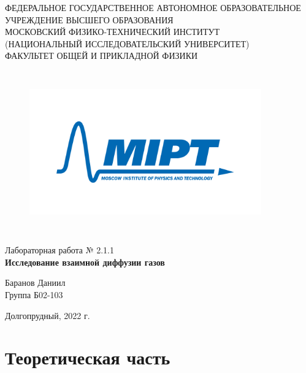 \documentclass[a4paper,12pt]{article} %
\begin{document}
\begin{center}
	\footnotesize{ФЕДЕРАЛЬНОЕ ГОСУДАРСТВЕННОЕ АВТОНОМНОЕ ОБРАЗОВАТЕЛЬНОЕ 			УЧРЕЖДЕНИЕ ВЫСШЕГО ОБРАЗОВАНИЯ}\\
	\footnotesize{МОСКОВСКИЙ ФИЗИКО-ТЕХНИЧЕСКИЙ ИНСТИТУТ\\(НАЦИОНАЛЬНЫЙ 			ИССЛЕДОВАТЕЛЬСКИЙ УНИВЕРСИТЕТ)}\\
	\footnotesize{ФАКУЛЬТЕТ ОБЩЕЙ И ПРИКЛАДНОЙ ФИЗИКИ\\}
	\hfill \break
	\hfill \break
	\hfill \break
	\hfill \break
\end{center}


\begin{figure}[h]
    \centering
    \includegraphics*[width=10cm,height=7cm,keepaspectratio]{mipt_eng_text_png.png}
    \label{fig:my_label}
\end{figure}


\begin{center}   
    \hfill \break
	\hfill \break
	\hfill \break
	\hfill \break
	\large{Лабораторная работа № 2.1.1\\\textbf{Исследование взаимной диффузии газов}}\\
	\hfill \break
	\hfill \break
	\hfill \break
	\hfill \break
	\begin{flushright}
		Баранов Даниил\\
		Группа Б02-103
	\end{flushright}
	\hfill \break
	\hfill \break
	\hfill \break
\end{center}
\hfill \break
\hfill \break
\hfill \break
\hfill \break
\begin{center}
	Долгопрудный, 2022 г.
\end{center}
\thispagestyle{empty}



\newpage
\section{Теоретическая часть}
\end{document}
